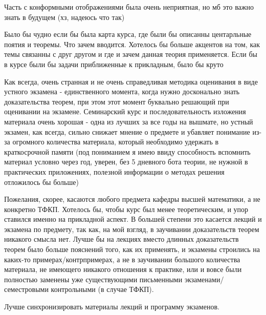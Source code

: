         \begin{commentbox}
            Часть с конформными отображениями была очень неприятная, но мб это важно знать в будущем (хз, надеюсь что так)
        \end{commentbox}

        \begin{commentbox}
            Было бы чудно если бы была карта курса, где были бы описанны центарльные поятия и теоремы. Что зачем вводится. Хотелось бы больше акцентов на том, как темы связанны с друг другом и где и зачем данная теория применяется. Если бы в курсе были бы задачи приближенные к прикладным, было бы круто
        \end{commentbox}

        \begin{commentbox}
            Как всегда, очень странная и не очень справедливая методика оценивания в виде устного экзамена - единственного момента, когда нужно досконально знать доказательства теорем, при этом этот момент буквально решающий при оценивании на экзамене. Семинарский курс и последовательность изложения материала очень хорошая - одна из лучших за все годы на вышмате, но устный экзамен, как всегда, сильно снижает мнение о предмете и убавляет понимание из-за огромного количества материала, который необходимо удержать в краткосрочной памяти (под пониманием я имею ввиду способность вспомнить материал условно через год, уверен, без 5 дневного бота теории, не нужной в практических приложениях, полезной информации о методах решения отложилось бы больше)
        \end{commentbox}

        \begin{commentbox}
            Пожелания, скорее, касаются любого предмета кафедры высшей математики, а не конкретно ТФКП. Хотелось бы, чтобы курс был менее теоретическим, и упор ставился именно на прикладной аспект. В большей степени это касается лекций и экзамена по предмету, так как, на мой взгляд, в заучивании доказательств теорем никакого смысла нет. Лучше бы на лекциях вместо длинных доказательств теорем было больше пояснений того, как их применять, и экзамены строились на каких-то примерах/контрпримерах, а не в заучивании большого количества материала, не имеющего никакого отношения к практике, или и вовсе были полностью заменены уже существующими письменными экзаменами/семестровыми контрольными (в случае ТФКП).
        \end{commentbox}

        \begin{commentbox}
            Лучше синхронизировать материалы лекций и программу экзаменов.
        \end{commentbox}

